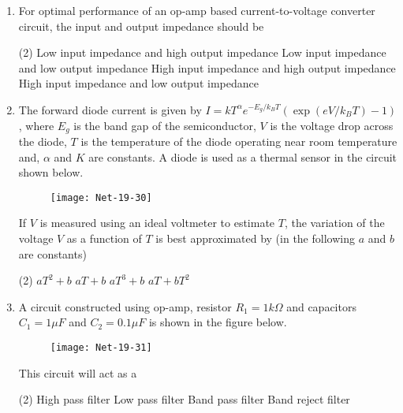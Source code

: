\begin{enumerate}
At a fixed value of $a$, the critical value of $b$, above which the minimum of $F$ will be at a non-zero value of magnetisation, is
 \begin{tasks}(2)
	\task[\textbf{a.}]$\sqrt{\frac{10 a}{3}}$
	\task[\textbf{b.}]$\sqrt{\frac{16 a}{3}}$
	\task[\textbf{c.}] $\frac{10}{3} \sqrt{a}$
	\task[\textbf{d.}] $\frac{16}{3} \sqrt{a}$
\end{tasks}
\item For optimal performance of an op-amp based current-to-voltage converter circuit, the input and output impedance should be
 \begin{tasks}(2)
	\task[\textbf{a.}] Low input impedance and high output impedance
	\task[\textbf{b.}]Low input impedance and low output impedance
	\task[\textbf{c.}] High input impedance and high output impedance
	\task[\textbf{d.}] High input impedance and low output impedance
\end{tasks}
\item The forward diode current is given by $I=k T^{\alpha} e^{-E_{g} / k_{B} T}\left(\exp \left(e V / k_{B} T\right)-1\right)$, where $E_{g}$ is the band gap of the semiconductor, $V$ is the voltage drop across the diode, $T$ is the temperature of the diode operating near room temperature and, $\alpha$ and $K$ are constants. A diode is used as a thermal sensor in the circuit shown below.
\begin{figure}[H]
	\centering
	\texttt{[image: Net-19-30]}
\end{figure}
If $V$ is measured using an ideal voltmeter to estimate $T$, the variation of the voltage $V$ as a function of $T$ is best approximated by (in the following $a$ and $b$ are constants)
 \begin{tasks}(2)
	\task[\textbf{a.}] $a T^{2}+b$
	\task[\textbf{b.}] $a T+b$
	\task[\textbf{c.}] $a T^{3}+b$
	\task[\textbf{d.}] $a T+b T^{2}$
\end{tasks}
\item A circuit constructed using op-amp, resistor $R_{1}=1 k \Omega$ and capacitors $C_{1}=1 \mu F$ and $C_{2}=0.1 \mu F$ is shown in the figure below.
\begin{figure}[H]
	\centering
	\texttt{[image: Net-19-31]}
\end{figure}
This circuit will act as a
 \begin{tasks}(2)
	\task[\textbf{a.}]High pass filter
	\task[\textbf{b.}]Low pass filter
	\task[\textbf{c.}]Band pass filter
	\task[\textbf{d.}]Band reject filter 
\end{tasks}

\end{enumerate}
